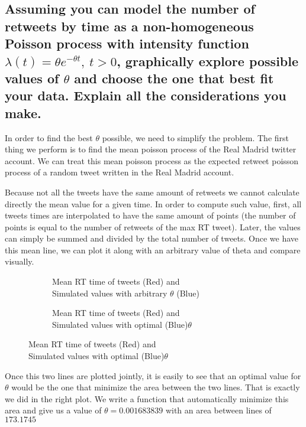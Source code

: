 \subsection{Assuming you can model the number of retweets by time as a non-homogeneous Poisson process with intensity function $ \lambda (t) = \theta e^{-\theta t},\ t>0$, graphically explore possible values of $\theta$ and choose the one that best fit your data. Explain all the considerations you make.}

In order to find the best $\theta$ possible, we need to simplify the problem. 
The first thing we perform is to find the mean poisson process of the Real Madrid twitter account. 
We can treat this mean poisson process as the expected retweet poisson process of a random tweet written in the Real Madrid account.

Because not all the tweets have the same amount of retweets we cannot calculate directly the mean value for a given time. 
In order to compute such value, first, all tweets times are interpolated to have the same amount of points (the number of points is equal to the number of retweets of the max RT tweet). 
Later, the values can simply be summed and divided by the total number of tweets. 
Once we have this mean line, we can plot it along with an arbitrary value of theta and compare visually.

\begin{figure}[H]
	\centering
	\begin{subfigure}{.5\textwidth}
		\centering
		
		\caption{Mean RT time of tweets (Red) and \\ Simulated values with arbitrary $\theta$ (Blue)}
		\label{fig:thetaNot}
	\end{subfigure}%
	\begin{subfigure}{.5\textwidth}
		\centering
		
		\caption{Mean RT time of tweets (Red) and \\Simulated values with optimal (Blue)$\theta$}
		\label{fig:thetaYes}
	\end{subfigure}
\end{figure}


Once this two lines are plotted jointly, it is easily to see that an optimal value for $\theta$ would be the one that minimize the area between the two lines. 
That is exactly we did in the right plot. 
We write a function that automatically minimize this area and give us a value of $\theta=0.001683839$ with an area between lines of $173.1745$

